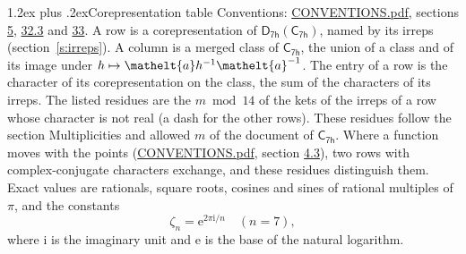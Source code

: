 \documentclass[10pt,a4paper]{article}
\makeatletter
\renewcommand\section{\@startsection{section}{1}{\z@}{-3ex plus -1ex minus -.2ex}%
  {1.2ex plus .2ex}{\normalfont\large\sffamily\bfseries\color{parttitle}}}
\numberwithin{equation}{section}
\newcommand{\eltfont}[1]{{\let\sigma\eltsigma\mathelt{#1}}}
\newcommand{\grp}[1]{\mathsf{#1}}
\newcommand{\elt}[1]{\eltfont{#1}}
\newcommand{\iunit}{\mathrm{i}}
\newcommand{\expe}{\mathrm{e}}
\newcommand{\rootunity}[1]{\zeta_{#1}}
\makeatother
\begin{document}
\section{Corepresentation table}\label{s:character_table}
Conventions: \href{../../CONVENTIONS.pdf}{CONVENTIONS.pdf}, sections \href{../../../rotation/CONVENTIONS.pdf\#conv.5}{5}, \href{../../CONVENTIONS.pdf\#conv.32.3}{32.3} and \href{../../CONVENTIONS.pdf\#conv.33}{33}.
A row is a corepresentation of $\grp{D_{7h}}(\grp{C_{7h}})$, named by its irreps (section~\ref{s:irreps}). A column is a merged class of $\grp{C_{7h}}$, the union of a class and of its image under $h \mapsto \elt{a} h^{-1} \elt{a}^{-1}$. The entry of a row is the character of its corepresentation on the class, the sum of the characters of its irreps.
\leavevmode\label{n:head.parity}The listed residues are the $m \bmod 14$ of the kets of the irreps of a row whose character is not real (a dash for the other rows). These residues follow the section Multiplicities and allowed $m$ of the document of \href{../../../rotation/data/pdf/C7h.pdf}{$\grp{C_{7h}}$}. Where a function moves with the points (\href{../../CONVENTIONS.pdf}{CONVENTIONS.pdf}, section \href{../../../rotation/CONVENTIONS.pdf\#conv.4.3}{4.3}), two rows with complex-conjugate characters exchange, and these residues distinguish them.
\leavevmode\label{n:constant.root}\label{n:index.root.order}Exact values are rationals, square roots, cosines and sines of rational multiples of $\pi$, and the constants
\begin{equation}\label{e:constants}\rootunity{n} = \expe^{2\pi\iunit/n}\quad(n = 7),\end{equation}
where $\iunit$ is the imaginary unit and $\expe$ is the base of the natural logarithm.
\end{document}
